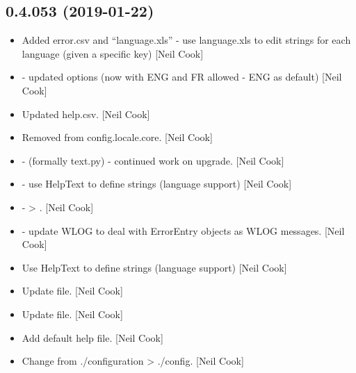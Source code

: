 \documentclass[a4paper,10pt,english]{report}
\begin{document}
\subsection{0.4.053 (2019-01-22)}
\label{\detokenize{misc/changelog:id210}}\begin{itemize}
\item {} 
Added error.csv and “language.xls” - use language.xls to edit strings
for each language (given a specific key) {[}Neil Cook{]}

\item {} 
 - updated options (now with ENG and FR allowed - ENG
as default) {[}Neil Cook{]}

\item {} 
Updated help.csv. {[}Neil Cook{]}

\item {} 
Removed  from config.locale.core. {[}Neil Cook{]}

\item {} 
 - (formally text.py) - continued work on upgrade. {[}Neil
Cook{]}

\item {} 
 - use HelpText to define strings (language
support) {[}Neil Cook{]}

\item {} 
 -  \textendash{}\textgreater{} . {[}Neil Cook{]}

\item {} 
 - update WLOG to deal with ErrorEntry objects as WLOG
messages. {[}Neil Cook{]}

\item {} 
Use HelpText to define strings (language support) {[}Neil Cook{]}

\item {} 
Update  file. {[}Neil Cook{]}

\item {} 
Update  file. {[}Neil Cook{]}

\item {} 
Add default help file. {[}Neil Cook{]}

\item {} 
Change from ./configuration \textendash{}\textgreater{} ./config. {[}Neil Cook{]}


\end{itemize}
\end{document}
